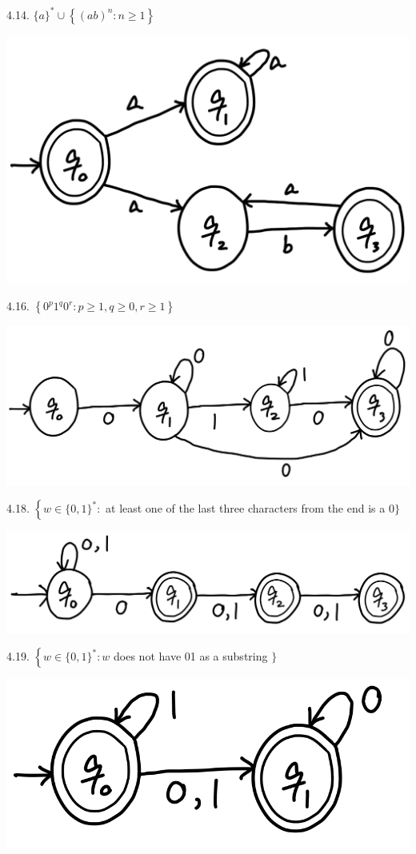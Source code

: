 \documentclass[10pt]{article}
\begin{document}
\begin{enumerate}[label={}]
            4.14. $\{a\}^* \cup\left\{(a b)^n: n \geq 1\right\}$

            \includegraphics[scale=0.3]{4.14}


            4.16. $\left\{0^p 1^q 0^r: p \geq 1, q \geq 0, r \geq 1\right\}$

            \includegraphics[scale=0.3]{4.16}

            4.18. $\left\{w \in\{0,1\}^*:\right.$ at least one of the last three characters from the end is a 0$\}$

            \includegraphics[scale=0.3]{4.18}

            4.19. $\left\{w \in\{0,1\}^*: w\right.$ does not have 01 as a substring $\}$

            \includegraphics[scale=0.3]{4.19}



\end{enumerate}
\end{document}
